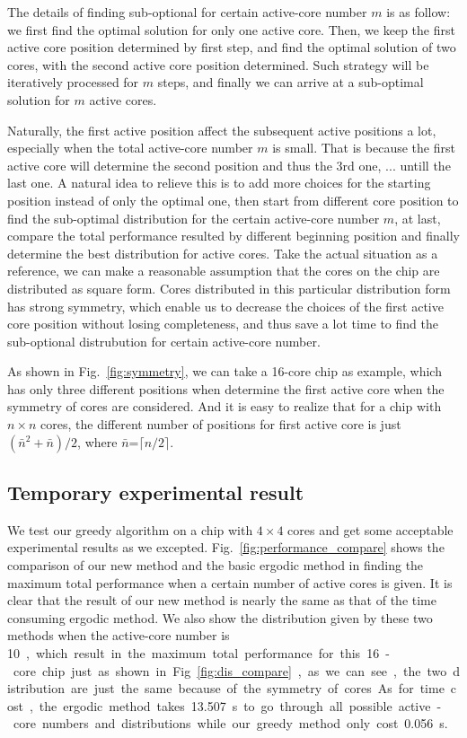 The details of finding sub-optional for certain active-core number $m$ is as follow: we first find the optimal solution for only one active core. Then, we keep
the first active core position determined by first step, and find the optimal solution of two cores, with the second active core position determined. Such strategy
will be iteratively processed for $m$ steps, and finally we can arrive at a sub-optimal solution for $m$ active cores.

Naturally, the first active position affect the subsequent active positions a lot, especially when the total active-core
number $m$ is small. That is because the first active core will determine the second position and thus the 3rd one, ...
untill the last one. A natural idea to relieve this is to add more choices for the starting position instead of only the
optimal one, then start from different core position to find the sub-optimal distribution for the certain active-core
number $m$, at last,  compare the total performance resulted by different beginning position and finally determine the
best distribution for active cores.
Take the actual situation as a reference, we can make a reasonable assumption that the cores on the chip are distributed as square form. Cores distributed in
this particular distribution form has strong symmetry, which enable us to decrease the choices of the first active core
position without losing completeness, and thus save a lot time to find the sub-optional distrubution for certain
active-core number.

As shown in Fig.~\ref{fig:symmetry}, we can take a 16-core chip as example, which has only three different positions when determine
the first active core when the symmetry of cores are considered. And it is easy to realize that for a chip with $n
\times n$ cores, the different number of positions for first active core is just $(\bar{n}^2+\bar{n})/2$, where
$\bar{n}$=$\lceil n/2 \rceil$.
\subsection{Temporary experimental result}
We test our greedy algorithm on a chip with $4 \times 4$ cores and get some acceptable experimental results as we
excepted. Fig.~\ref{fig:performance_compare} shows the comparison of our new method and the basic ergodic method in finding the maximum total
performance when a certain number of active cores is given. It is clear that the result of our new method is nearly the
same as that of the time consuming ergodic method. We also show the distribution given by these two methods when the
active-core number is \SI{10}, which result in the maximum total performance for this 16-core chip just as shown in
Fig.~\ref{fig:dis_compare}, as we can see, the two distribution are just the same because of the symmetry of cores.
As for time cost, the ergodic method takes \SI{13.507}s to go through all possible active-core numbers and distributions
while our greedy method only cost \SI{0.056}s.

